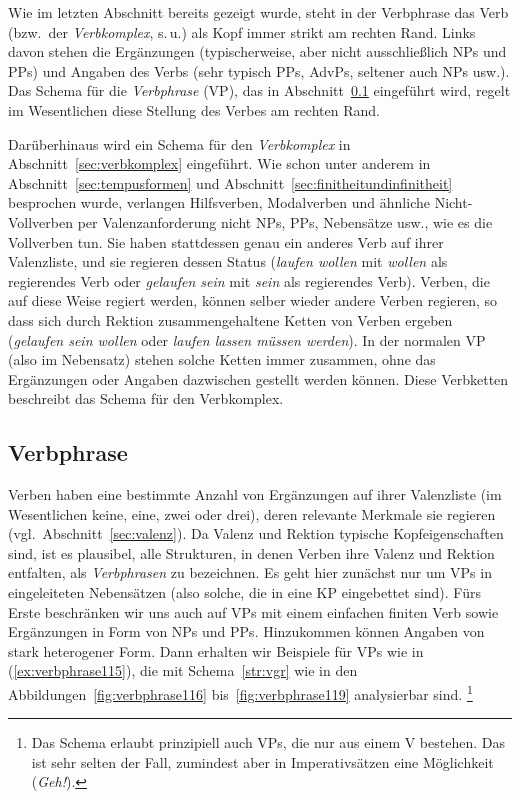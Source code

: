 Wie im letzten Abschnitt bereits gezeigt wurde, steht in der Verbphrase das Verb (bzw.\ der \textit{Verbkomplex}, s.\,u.) als Kopf immer strikt am rechten Rand.
Links davon stehen die Ergänzungen (typischerweise, aber nicht ausschließlich NPs und PPs) und Angaben des Verbs (sehr typisch \zB PPs, AdvPs, seltener auch NPs usw.).
Das Schema für die \textit{Verbphrase} (VP), das in Abschnitt~\ref{sec:verbphrase} eingeführt wird, regelt im Wesentlichen diese Stellung des Verbes am rechten Rand.

Darüberhinaus wird ein Schema für den \textit{Verbkomplex} in Abschnitt~\ref{sec:verbkomplex} eingeführt.
Wie schon unter anderem in Abschnitt~\ref{sec:tempusformen} und Abschnitt~\ref{sec:finitheitundinfinitheit} besprochen wurde, verlangen Hilfsverben, Modalverben und ähnliche Nicht-Vollverben per Valenzanforderung nicht NPs, PPs, Nebensätze usw., wie es die Vollverben tun.
Sie haben stattdessen genau ein anderes Verb auf ihrer Valenzliste, und sie regieren dessen Status (\zB \textit{laufen wollen} mit \textit{wollen} als regierendes Verb oder \textit{gelaufen sein} mit \textit{sein} als regierendes Verb).
Verben, die auf diese Weise regiert werden, können selber wieder andere Verben regieren, so dass sich durch Rektion zusammengehaltene Ketten von Verben ergeben (\zB \textit{gelaufen sein wollen} oder \textit{laufen lassen müssen werden}).
In der normalen VP (also im Nebensatz) stehen solche Ketten immer zusammen, ohne das Ergänzungen oder Angaben dazwischen gestellt werden können.
Diese Verbketten beschreibt das Schema für den Verbkomplex.

\subsection{Verbphrase}
\label{sec:verbphrase}


Verben haben eine bestimmte Anzahl von Ergänzungen auf ihrer Valenzliste (im Wesentlichen keine, eine, zwei oder drei), deren relevante Merkmale sie regieren (vgl.\ Abschnitt~\ref{sec:valenz}).
Da Valenz und Rektion typische Kopfeigenschaften sind, ist es plausibel, alle Strukturen, in denen Verben ihre Valenz und Rektion entfalten, als \textit{Verbphrasen} zu bezeichnen.
Es geht hier zunächst nur um VPs in eingeleiteten Nebensätzen (also solche, die in eine KP eingebettet sind).
Fürs Erste beschränken wir uns auch auf VPs mit einem einfachen finiten Verb sowie Ergänzungen in Form von NPs und PPs.
Hinzukommen können Angaben von stark heterogener Form.
Dann erhalten wir Beispiele für VPs wie in (\ref{ex:verbphrase115}), die mit Schema~\ref{str:vgr} wie in den Abbildungen~\ref{fig:verbphrase116} bis~\ref{fig:verbphrase119} analysierbar sind.%
\footnote{Das Schema erlaubt prinzipiell auch VPs, die nur aus einem V bestehen.
Das ist sehr selten der Fall, zumindest aber in Imperativsätzen eine Möglichkeit (\zB \textit{Geh!}).}

